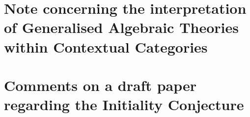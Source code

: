 \documentclass[10pt,a4paper]{article}
\theoremstyle{remark}
\begin{document}
\section{Note concerning the interpretation of Generalised Algebraic Theories within Contextual Categories}
%



\section{Comments on a draft paper regarding the Initiality Conjecture}
%


% 


\end{document}
